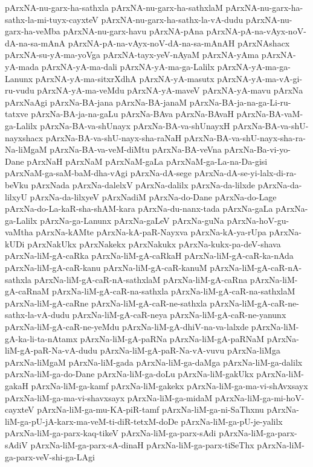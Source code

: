 {pArxNA-nu-garx-ha-sathxla
pArxNA-nu-garx-ha-sathxlaM
pArxNA-nu-garx-ha-sathx-la-mi-tuyx-cayxteV
pArxNA-nu-garx-ha-sathx-la-vA-dudu
pArxNA-nu-garx-ha-veMba
pArxNA-nu-garx-havu
pArxNA-pAna
pArxNA-pA-na-vAyx-noV-dA-na-sa-mAnA
pArxNA-pA-na-vAyx-noV-dA-na-sa-mAnAH
pArxNAshacx
pArxNA-su-yA-ma-yoVga
pArxNA-tayx-yeV-nAyaM
pArxNA-yAma
pArxNA-yA-mada
pArxNA-yA-ma-dali
pArxNA-yA-ma-ga-Lalilx
pArxNA-yA-ma-ga-Lanunx
pArxNA-yA-ma-sitxrXdhA
pArxNA-yA-masutx
pArxNA-yA-ma-vA-gi-ru-vudu
pArxNA-yA-ma-veMdu
pArxNA-yA-maveV
pArxNA-yA-mavu
pArxNa
pArxNaAgi
pArxNa-BA-jana
pArxNa-BA-janaM
pArxNa-BA-ja-na-ga-Li-ru-tatxve
pArxNa-BA-ja-na-gaLu
pArxNa-BAva
pArxNa-BAvaH
pArxNa-BA-vaM-ga-Lalilx
pArxNa-BA-va-shUnayx
pArxNa-BA-va-shUnayxH
pArxNa-BA-va-shU-nayxshacx
pArxNa-BA-va-shU-nayx-sha-raNaH
pArxNa-BA-va-shU-nayx-sha-ra-Na-liMgaM
pArxNa-BA-va-veM-diMtu
pArxNa-BA-veVna
pArxNa-Ba-vi-yo-Dane
pArxNaH
pArxNaM
pArxNaM-gaLa
pArxNaM-ga-La-na-Da-gisi
pArxNaM-ga-saM-baM-dha-vAgi
pArxNa-dA-sege
pArxNa-dA-se-yi-lalx-di-ra-beVku
pArxNada
pArxNa-dalelxV
pArxNa-dalilx
pArxNa-da-lilxde
pArxNa-da-lilxyU
pArxNa-da-lilxyeV
pArxNadiM
pArxNa-do-Dane
pArxNa-do-Lage
pArxNa-do-La-kaR-sha-shAM-kara
pArxNa-du-nanx-tada
pArxNa-gaLa
pArxNa-ga-Lalilx
pArxNa-ga-Lanunx
pArxNa-gaLeV
pArxNa-guNa
pArxNa-hoV-gu-vaMtha
pArxNa-kAMte
pArxNa-kA-paR-Nayxva
pArxNa-kA-ya-rUpa
pArxNa-kUDi
pArxNakUkx
pArxNakekx
pArxNakukx
pArxNa-kukx-pa-deV-shava
pArxNa-liM-gA-caRka
pArxNa-liM-gA-caRkaH
pArxNa-liM-gA-caR-ka-nAda
pArxNa-liM-gA-caR-kanu
pArxNa-liM-gA-caR-kanuM
pArxNa-liM-gA-caR-nA-sathxla
pArxNa-liM-gA-caR-nA-sathxlaM
pArxNa-liM-gA-caRna
pArxNa-liM-gA-caRnaM
pArxNa-liM-gA-caR-na-sathxla
pArxNa-liM-gA-caR-na-sathxlaM
pArxNa-liM-gA-caRne
pArxNa-liM-gA-caR-ne-sathxla
pArxNa-liM-gA-caR-ne-sathx-la-vA-dudu
pArxNa-liM-gA-caR-neya
pArxNa-liM-gA-caR-ne-yanunx
pArxNa-liM-gA-caR-ne-yeMdu
pArxNa-liM-gA-dhiV-na-va-lalxde
pArxNa-liM-gA-ka-li-ta-nAtamx
pArxNa-liM-gA-paRNa
pArxNa-liM-gA-paRNaM
pArxNa-liM-gA-paR-Na-vA-dudu
pArxNa-liM-gA-paR-Na-vA-vuvu
pArxNa-liMga
pArxNa-liMgaM
pArxNa-liM-gada
pArxNa-liM-ga-daMga
pArxNa-liM-ga-dalilx
pArxNa-liM-ga-do-Dane
pArxNa-liM-ga-doLu
pArxNa-liM-gakUkx
pArxNa-liM-gakaH
pArxNa-liM-ga-kamf
pArxNa-liM-gakekx
pArxNa-liM-ga-ma-vi-shAvxsayx
pArxNa-liM-ga-ma-vi-shavxsayx
pArxNa-liM-ga-midaM
pArxNa-liM-ga-mi-hoV-cayxteV
pArxNa-liM-ga-mu-KA-piR-tamf
pArxNa-liM-ga-ni-SaThxnu
pArxNa-liM-ga-pU-jA-karx-ma-veM-ti-diR-tetxM-doDe
pArxNa-liM-ga-pU-je-yalilx
pArxNa-liM-ga-parx-kaq-tikeV
pArxNa-liM-ga-parx-sAdi
pArxNa-liM-ga-parx-sAdiV
pArxNa-liM-ga-parx-sA-dinaH
pArxNa-liM-ga-parx-tiSeThx
pArxNa-liM-ga-parx-veV-shi-ga-LAgi
}
